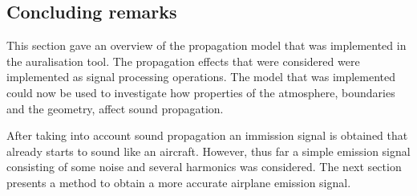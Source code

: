 \newpage
\subsection{Concluding remarks}
This section gave an overview of the propagation model that was implemented in
the auralisation tool. The propagation effects that were considered were
implemented as signal processing operations. The model that was implemented
could now be used to investigate how properties of the atmosphere, boundaries
and the geometry, affect sound propagation.

After taking into account sound propagation an immission signal is obtained that
already starts to sound like an aircraft. However, thus far a simple emission
signal consisting of some noise and several harmonics was considered. The next
section presents a method to obtain a more accurate airplane emission signal.

